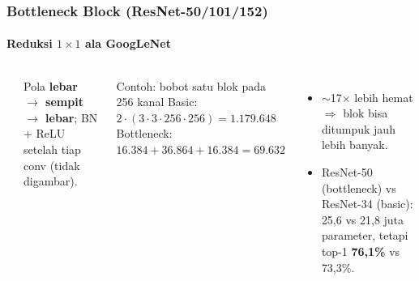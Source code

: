 \documentclass[t,aspectratio=169,xcolor=dvipsnames]{beamer}
\begin{document}
\begin{frame}
    \frametitle{Bottleneck Block (ResNet-50/101/152)}
    \framesubtitle{Reduksi $1\times1$ ala GoogLeNet}
    \footnotesize

    \begin{columns}[T]
        \begin{center}
        \end{center}
        {\scriptsize\color{dlMute} Pola \textbf{lebar $\to$ sempit $\to$ lebar}; BN + ReLU setelah tiap conv (tidak digambar).}

        \begin{exampleblock}{Contoh: bobot satu blok pada 256 kanal}
            Basic: $2\cdot(3\cdot3\cdot256\cdot256) = 1.179.648$\\[2pt]
            Bottleneck: $16.384 + 36.864 + 16.384 = \mathbf{69.632}$
        \end{exampleblock}
        \begin{itemize}
            \item $\sim$17$\times$ lebih hemat $\Rightarrow$ blok bisa ditumpuk jauh lebih banyak.
            \item ResNet-50 (bottleneck) vs ResNet-34 (basic): 25,6 vs 21,8 juta parameter, tetapi top-1 \textbf{76,1\%} vs 73,3\%.
        \end{itemize}
    \end{columns}
\end{frame}
\end{document}

